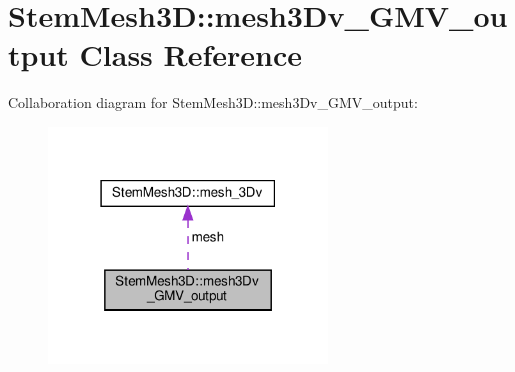 \hypertarget{classStemMesh3D_1_1mesh3Dv__GMV__output}{}\section{Stem\+Mesh3D\+:\+:mesh3\+Dv\+\_\+\+G\+M\+V\+\_\+output Class Reference}
\label{classStemMesh3D_1_1mesh3Dv__GMV__output}


Collaboration diagram for Stem\+Mesh3D\+:\+:mesh3\+Dv\+\_\+\+G\+M\+V\+\_\+output\+:\nopagebreak
\begin{figure}[H]
\begin{center}
\leavevmode
\includegraphics[width=210pt]{classStemMesh3D_1_1mesh3Dv__GMV__output__coll__graph}
\end{center}
\end{figure}
